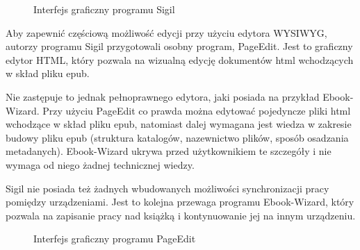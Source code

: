 \begin{figure}[h]
    \centering
    \setlength{\fboxsep}{0pt}
    \setlength{\fboxrule}{0.4pt}
    \caption{Interfejs graficzny programu Sigil}
    \label{fig:obrazek_z_ramką}
\end{figure}

Aby zapewnić częściową możliwość edycji przy użyciu edytora WYSIWYG, autorzy programu Sigil przygotowali osobny program, PageEdit. Jest to graficzny edytor HTML, który pozwala na wizualną edycję dokumentów html wchodzących w skład pliku epub. \cite{sigil_user_guide}

Nie zastępuje to jednak pełnoprawnego edytora, jaki posiada na przykład Ebook-Wizard. Przy użyciu PageEdit co prawda można edytować pojedyncze pliki html wchodzące w skład pliku epub, natomiast dalej wymagana jest wiedza w zakresie budowy pliku epub (struktura katalogów, nazewnictwo plików, sposób osadzania metadanych). Ebook-Wizard ukrywa przed użytkownikiem te szczegóły i nie wymaga od niego żadnej technicznej wiedzy.

Sigil nie posiada też żadnych wbudowanych możliwości synchronizacji pracy pomiędzy urządzeniami. Jest to kolejna przewaga programu Ebook-Wizard, który pozwala na zapisanie pracy nad książką i kontynuowanie jej na innym urządzeniu.

\begin{figure}[h]
    \centering
    \setlength{\fboxsep}{0pt}
    \setlength{\fboxrule}{0.4pt}
    \caption{Interfejs graficzny programu PageEdit}
    \label{fig:obrazek_z_ramką}
\end{figure}

